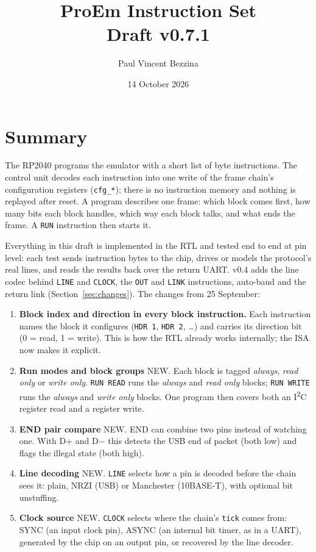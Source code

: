 \documentclass[11pt,a4paper]{article}
\title{ProEm Instruction Set\\\large Draft v0.7.1}
\author{Paul Vincent Bezzina}
\date{14 October 2026}
\newcommand{\new}{\textcolor{newc}{\textsf{\small NEW}}}
\newcommand{\sig}[1]{\texttt{#1}}
\begin{document}
\maketitle

\section{Summary}

The RP2040 programs the emulator with a short list of byte instructions. The control unit decodes each instruction into one write of the frame chain's configuration registers (\sig{cfg\_*}); there is no instruction memory and nothing is replayed after reset. A program describes one frame: which block comes first, how many bits each block handles, which way each block talks, and what ends the frame. A \sig{RUN} instruction then starts it.

Everything in this draft is implemented in the RTL and tested end to end at pin level: each test sends instruction bytes to the chip, drives or models the protocol's real lines, and reads the results back over the return UART. v0.4 adds the line codec behind \sig{LINE} and \sig{CLOCK}, the \sig{OUT} and \sig{LINK} instructions, auto-baud and the return link (Section~\ref{sec:changes}). The changes from 25 September:

\begin{enumerate}
\item \textbf{Block index and direction in every block instruction.} Each instruction names the block it configures (\sig{HDR 1}, \sig{HDR 2}, \ldots) and carries its direction bit (0 = read, 1 = write). This is how the RTL already works internally; the ISA now makes it explicit.
\item \textbf{Run modes and block groups} \new. Each block is tagged \emph{always}, \emph{read only} or \emph{write only}. \sig{RUN READ} runs the \emph{always} and \emph{read only} blocks; \sig{RUN WRITE} runs the \emph{always} and \emph{write only} blocks. One program then covers both an I\textsuperscript{2}C register read and a register write.
\item \textbf{END pair compare} \new. END can combine two pins instead of watching one. With D+ and D$-$ this detects the USB end of packet (both low) and flags the illegal state (both high).
\item \textbf{Line decoding} \new. \sig{LINE} selects how a pin is decoded before the chain sees it: plain, NRZI (USB) or Manchester (10BASE-T), with optional bit unstuffing.
\item \textbf{Clock source} \new. \sig{CLOCK} selects where the chain's \sig{tick} comes from: SYNC (an input clock pin), ASYNC (an internal bit timer, as in a UART), generated by the chip on an output pin, or recovered by the line decoder.
\end{enumerate}
\end{document}
